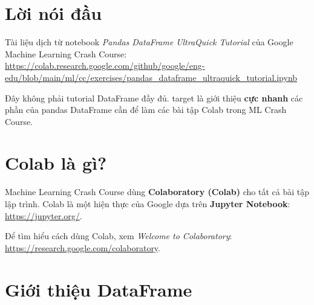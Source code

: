 \documentclass[12pt,a4paper]{article}
\newcommand{\mlccurl}[1]{\url{#1}}
\begin{document}

\newpage
\tableofcontents
\newpage

\section*{Lời nói đầu}

\begin{ynghia}[title={Nguồn}]
Tài liệu dịch từ notebook \textit{Pandas DataFrame UltraQuick Tutorial} của Google Machine Learning Crash Course:
\mlccurl{https://colab.research.google.com/github/google/eng-edu/blob/main/ml/cc/exercises/pandas_dataframe_ultraquick_tutorial.ipynb}
\end{ynghia}

\begin{luuy}[title={target}]
Đây không phải tutorial DataFrame đầy đủ. target là giới thiệu \textbf{cực nhanh} các phần của pandas DataFrame cần để làm các bài tập Colab trong ML Crash Course.
\end{luuy}

\newpage

\section{Colab là gì?}

\begin{dinhnghia}[title={Colaboratory (Colab)}]
Machine Learning Crash Course dùng \textbf{Colaboratory (Colab)} cho tất cả bài tập lập trình.
Colab là một hiện thực của Google dựa trên \textbf{Jupyter Notebook}:
\mlccurl{https://jupyter.org/}.

Để tìm hiểu cách dùng Colab, xem \textit{Welcome to Colaboratory}:
\mlccurl{https://research.google.com/colaboratory}.
\end{dinhnghia}

\section{Giới thiệu DataFrame}
\end{document}
